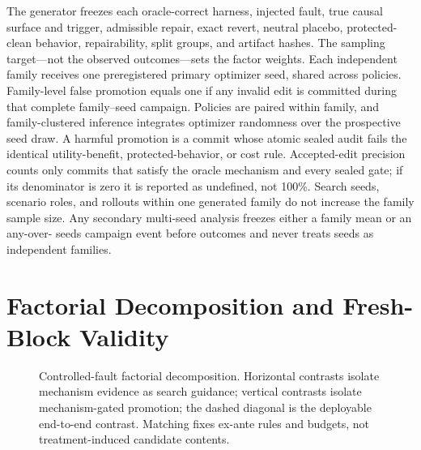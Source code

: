 The generator freezes each oracle-correct harness, injected fault, true causal
surface and trigger, admissible repair, exact revert, neutral placebo,
protected-clean behavior, repairability, split groups, and artifact hashes.
The sampling target---not the observed outcomes---sets the factor weights.
Each independent family receives one preregistered primary optimizer seed,
shared across policies.  Family-level false promotion equals one if any invalid
edit is committed during that complete family--seed campaign.  Policies are
paired within family, and family-clustered inference integrates optimizer
randomness over the prospective seed draw.  A harmful promotion is a
commit whose atomic sealed audit fails the identical utility-benefit,
protected-behavior, or cost rule.  Accepted-edit precision counts only commits
that satisfy the oracle mechanism and every sealed gate; if its denominator is
zero it is reported as undefined, not 100\%.  Search seeds, scenario roles, and
rollouts within one generated family do not increase the family sample size.
Any secondary multi-seed analysis freezes either a family mean or an any-over-
seeds campaign event before outcomes and never treats seeds as independent
families.

\section{Factorial Decomposition and Fresh-Block Validity}
\label{app:factorial}

\begin{figure}[h]
  \centering
  
  \caption{Controlled-fault factorial decomposition.  Horizontal contrasts
  isolate mechanism evidence as search guidance; vertical contrasts isolate
  mechanism-gated promotion; the dashed diagonal is the deployable end-to-end
  contrast.  Matching fixes ex-ante rules and budgets, not treatment-induced
  candidate contents.}
  \label{fig:factorial-decomposition}
\end{figure}

